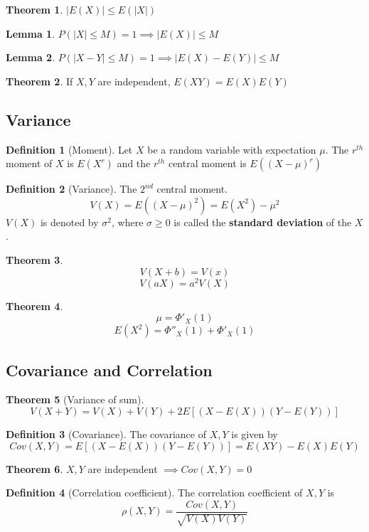 \documentclass[10pt, a4paper]{extarticle}
\theoremstyle{definition}
\newtheorem{thm}{Theorem}
\newtheorem{lem}{Lemma}[thm]
\newtheorem{defn}{Definition}
\begin{document}
\begin{thm}
	$|E(X)|\leq E(|X|)$
\end{thm}
\begin{lem}
	$P(|X|\leq M)=1\implies |E(X)|\leq M$
\end{lem}
\begin{lem}
	$P(|X-Y|\leq M)=1\implies |E(X)-E(Y)|\leq M$
\end{lem}

\begin{thm}
	If $X,Y$ are independent, $E(XY)=E(X)E(Y)$
\end{thm}

\subsection{Variance}
\begin{defn}[Moment]
	Let $X$ be a random variable with expectation $\mu$. The $r^{th}$ moment of $X$ is $E(X^r)$ and the $r^{th}$ central moment is $E((X-\mu)^r)$
\end{defn}

\begin{defn}[Variance]
	The $2^{nd}$ central moment.
	\[V(X)=E((X-\mu)^2)=E(X^2)-\mu^2\]
	$V(X)$ is denoted by $\sigma^2$, where $\sigma\geq 0$ is called the \textbf{standard deviation} of the $X$.
\end{defn}

\begin{thm}
	\[V(X+b)=V(x)\]\[V(aX)=a^2V(X)\]
\end{thm}


\begin{thm}
	\[\mu=\Phi'_X(1)\]\[E(X^2)=\Phi''_X(1)+\Phi'_X(1)\]
\end{thm}

\subsection{Covariance and Correlation}
\begin{thm}[Variance of sum]
	\[V(X+Y)=V(X)+V(Y)+2E[(X-E(X))(Y-E(Y))]\]
\end{thm}
\begin{defn}[Covariance]
	The covariance of $X,Y$ is given by
	\[Cov(X,Y)=E[(X-E(X))(Y-E(Y))]=E(XY)-E(X)E(Y)\]
\end{defn}
\begin{thm}
	$X,Y$ are independent $\implies Cov(X,Y)=0$
\end{thm}

\begin{defn}[Correlation coefficient]
	The correlation coefficient of $X,Y$ is
	\[\rho(X,Y)=\frac{Cov(X,Y)}{\sqrt{V(X)V(Y)}}\]
\end{defn}
\end{document}
